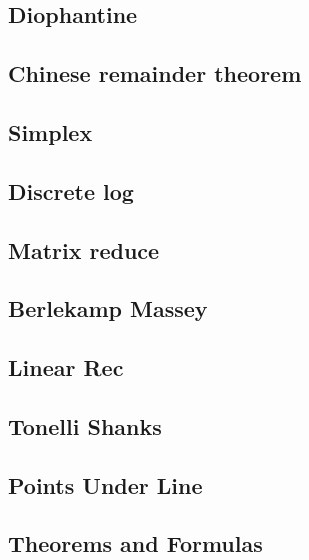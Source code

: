 \begin{multicols}{2}
\subsection{Diophantine}

\subsection{Chinese remainder theorem}

\subsection{Simplex}

\subsection{Discrete log}

\subsection{Matrix reduce}

\subsection{Berlekamp Massey}

\subsection{Linear Rec}

\subsection{Tonelli Shanks}

\subsection{Points Under Line}

\subsection{Theorems and Formulas}



\end{multicols}
